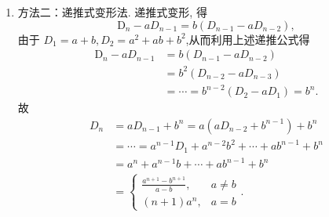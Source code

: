 \documentclass[12pt,fontset=fandol]{ctexart}
\begin{document}
\begin{solve}
\begin{enumerate}
                \item 方法二：递推式变形法. 递推式变形, 得
                        \[\mathrm{D}_{n}-a D_{n-1}=b\left(D_{n-1}-a D_{n-2}\right),\]
                        由于 $D_{1}=a+b, D_{2}=a^{2}+a b+b^{2}$,从而利用上述递推公式得
                        \begin{align*}
                            \mathrm{D}_{n}-a D_{n-1} & =b\left(D_{n-1}-a D_{n-2}\right)                \\
                                                    & =b^{2}\left(D_{n-2}-a D_{n-3}\right)            \\
                                                    & =\cdots=b^{n-2}\left(D_{2}-a D_{1}\right)=b^{n}.
                        \end{align*}
                        故\begin{align*}
                            D_{n} & =a D_{n-1}+b^{n}=a\left(a D_{n-2}+b^{n-1}\right)+b^{n}     \\
                                  & =\cdots=a^{n-1} D_{1}+a^{n-2} b^{2}+\cdots+a b^{n-1}+b^{n} \\
                                  & =a^{n}+a^{n-1} b+\cdots+a b^{n-1}+b^{n}                    \\
                                  & =\begin{cases}
                                        \displaystyle\frac{a^{n+1}-b^{n+1}}{a-b}, & a\neq b \\
                                        (n+1)a^n,                                 & a=b
                                     \end{cases}.
                        \end{align*}
            \end{enumerate}
\end{solve}
\end{document}
